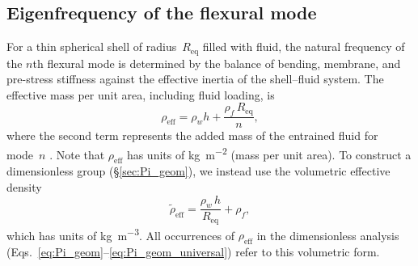 
\subsection{Eigenfrequency of the flexural mode}
\label{sec:eigenfreq}

For a thin spherical shell of radius~$R_{\mathrm{eq}}$ filled with
fluid, the natural frequency of the $n$th flexural mode is determined
by the balance of bending, membrane, and pre-stress stiffness against
the effective inertia of the shell--fluid system.  The effective mass
per unit area, including fluid loading, is
\begin{equation}
  \rho_{\mathrm{eff}} = \rho_w h + \frac{\rho_f\, R_{\mathrm{eq}}}{n},
  \label{eq:rho_eff}
\end{equation}
where the second term represents the added mass of the entrained fluid
for mode~$n$ \cite{Junger1986, lamb1882}.  Note that
$\rho_{\mathrm{eff}}$ has units of
\si{\kilogram\per\metre\squared} (mass per unit area).  To construct a
dimensionless group (\S\ref{sec:Pi_geom}), we instead use
the volumetric effective density
\begin{equation}
  \tilde{\rho}_{\mathrm{eff}} = \frac{\rho_w\, h}{R_{\mathrm{eq}}} + \rho_f,
  \label{eq:rho_eff_vol}
\end{equation}
which has units of \si{\kilogram\per\metre\cubed}.  All occurrences of
$\rho_{\mathrm{eff}}$ in the dimensionless analysis
(Eqs.~\ref{eq:Pi_geom}--\ref{eq:Pi_geom_universal}) refer to this
volumetric form.

